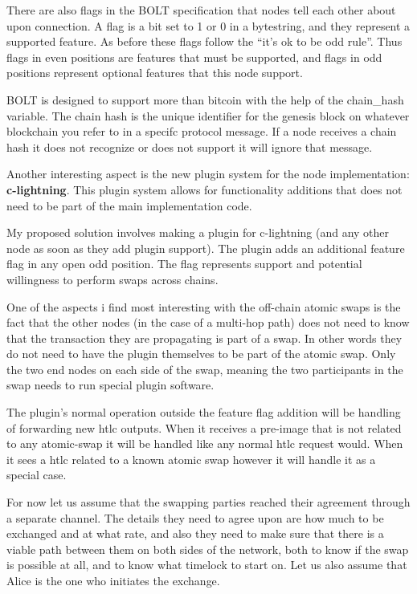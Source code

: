 There are also flags in the BOLT specification that nodes tell each other about
upon connection. A flag is a bit set to 1 or 0 in a bytestring, and they 
represent a supported feature. As before these
flags follow the \enquote{it's ok to be odd rule}. Thus flags in even positions are 
features that must be supported, and flags in odd positions represent optional
features that this node support.

BOLT is designed to support more than bitcoin with the help of the chain\_hash 
variable. The chain hash is the unique identifier for the genesis block on
whatever blockchain you refer to in a specifc protocol message. If a node
receives a chain hash it does not recognize or does not support it will ignore
that message.\cite{bolt}

Another interesting aspect is the new plugin system for the node implementation: 
\textbf{c-lightning}. This plugin system allows for functionality additions that
does not need to be part of the main implementation code. 

My proposed solution involves making a plugin for c-lightning (and any other 
node as soon as they add plugin support). The plugin adds an additional 
feature flag in any open odd position. The flag represents support and potential
willingness to perform swaps across chains. 

One of the aspects i find most interesting with the off-chain atomic swaps is
the fact that the other nodes (in the case of a multi-hop path) does not need
to know that the transaction they are propagating is part of a swap. In other 
words they do not need to have the plugin themselves to be part of the atomic
swap. Only the two end nodes on each side of the swap, meaning the two 
participants in the swap needs to run special plugin software. 

The plugin's normal operation outside the feature flag addition will be handling 
of forwarding new htlc outputs. When it receives a pre-image that is not related 
to any atomic-swap it will be handled like any normal htlc request would. 
When it sees a htlc related to a known atomic swap however it will handle it as 
a special case.

For now let us assume that the swapping parties reached their agreement through 
a separate channel. The details they need to agree upon are how much to be 
exchanged and at what rate, and also they need to make sure that there is a 
viable path between them on both sides of the network, both to know if the swap 
is possible at all, and to know what timelock to start on. Let us also 
assume that Alice is the one who initiates the exchange.

